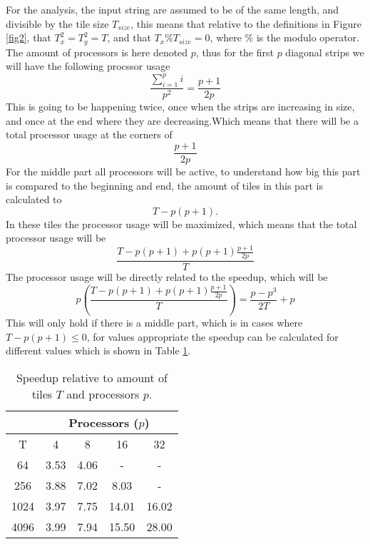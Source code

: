 For the analysis, the input string are assumed to be of the same length, and divisible by the tile size $T_{size}$, this means that relative to the definitions in Figure \ref{fig2}, that $T_x^2 = T_y^2 = T$, and that $T_x \% T_{size} = 0$, where $\%$ is the modulo operator. The amount of processors is here denoted $p$, thus for the first $p$ diagonal strips we will have the following procssor usage
$$
\frac{\sum_{i=1}^p i}{p^2} = \frac{p+1}{2p}
$$
This is going to be happening twice, once when the strips are increasing in size, and once at the end where they are decreasing.Which means that there will be a total processor usage at the corners of
$$
\frac{p+1}{2p}
$$
For the middle part all processors will be active, to understand how big this part is compared to the beginning and end, the amount of tiles in this part is calculated to
$$
  T - p(p+1).
$$
In these tiles the processor usage will be maximized, which means that the total processor usage will be
$$
\frac{T - p(p+1) + p(p+1)\frac{p+1}{2p}}{T}
$$
The processor usage will be directly related to the speedup, which will be
$$
p \left(\frac{T - p(p+1) + p(p+1)\frac{p+1}{2p}}{T}\right) = \frac{p - p^3}{2T} + p
$$
This will only hold if there is a middle part, which is in cases where $T - p(p+1) \leq 0$, for values appropriate the speedup can be calculated for different values which is shown in Table \ref{tab1}.
\begin{table}[H]
  \center
  \begin{tabular}{|c||c|c|c|c|}
  \hline
          & \multicolumn{4}{c|}{Processors ($p$)}\\
  \hline
     T    & 4    & 8     & 16    & 32\\
  \hline
     64   & 3.53 & 4.06  & -     & - \\
  \hline
     256  & 3.88 & 7.02  & 8.03  & - \\
  \hline
     1024 & 3.97 & 7.75  & 14.01 & 16.02 \\
  \hline
     4096 & 3.99 & 7.94  & 15.50 & 28.00\\
  \hline
  \end{tabular}
  \caption{Speedup relative to amount of tiles $T$ and processors $p$.}
  \label{tab1}
\end{table}
